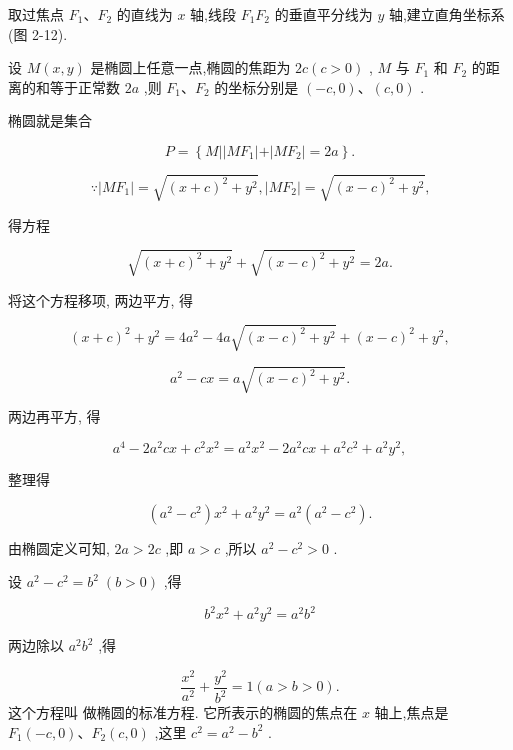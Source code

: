 \documentclass[lang=cn,newtx,10pt,scheme=chinese]{elegantbook}
\begin{document}
取过焦点 \({F}_{1}\text{、}{F}_{2}\) 的直线为 \(x\) 轴,线段 \({F}_{1}{F}_{2}\) 的垂直平分线为 \(y\) 轴,建立直角坐标系 (图 2-12).

设 \(M\left( {x,y}\right)\) 是椭圆上任意一点,椭圆的焦距为 \({2c}\left( {c > 0}\right)\) , \(M\) 与 \({F}_{1}\) 和 \({F}_{2}\) 的距离的和等于正常数 \({2a}\) ,则 \({F}_{1}\text{、}{F}_{2}\) 的坐标分别是 \(\left( {-c,0}\right) \text{、}\left( {c,0}\right)\) .

椭圆就是集合

\[
  P = \left\{ {M\left| \right| M{F}_{1}\left| +\right| M{F}_{2} \mid = {2a}}\right\} .
\]

\[
  \because \left| {M{F}_{1}}\right| = \sqrt{{\left( x + c\right) }^{2} + {y}^{2}},\left| {M{F}_{2}}\right| = \sqrt{{\left( x - c\right) }^{2} + {y}^{2}}\text{,}
\]

得方程

\[
  \sqrt{{\left( x + c\right) }^{2} + {y}^{2}} + \sqrt{{\left( x - c\right) }^{2} + {y}^{2}} = {2a}.
\]

将这个方程移项, 两边平方, 得

\[
    {\left( x + c\right) }^{2} + {y}^{2} = 4{a}^{2} - {4a}\sqrt{{\left( x - c\right) }^{2} + {y}^{2}} + {\left( x - c\right) }^{2} + {y}^{2},
\]

\[
    {a}^{2} - {cx} = a\sqrt{{\left( x - c\right) }^{2} + {y}^{2}}.
\]

两边再平方, 得

\[
    {a}^{4} - 2{a}^{2}{cx} + {c}^{2}{x}^{2} = {a}^{2}{x}^{2} - 2{a}^{2}{cx} + {a}^{2}{c}^{2} + {a}^{2}{y}^{2},
\]

整理得

\[
  \left( {{a}^{2} - {c}^{2}}\right) {x}^{2} + {a}^{2}{y}^{2} = {a}^{2}\left( {{a}^{2} - {c}^{2}}\right) .
\]

由椭圆定义可知, \({2a} > {2c}\) ,即 \(a > c\) ,所以 \({a}^{2} - {c}^{2} > 0\) .

设 \({a}^{2} - {c}^{2} = {b}^{2}\;\left( {b > 0}\right)\) ,得

\[
    {b}^{2}{x}^{2} + {a}^{2}{y}^{2} = {a}^{2}{b}^{2}
\]

两边除以 \({a}^{2}{b}^{2}\) ,得
\begin{definition}[椭圆的标准方程] 
\[
  \frac{{x}^{2}}{{a}^{2}} + \frac{{y}^{2}}{{b}^{2}} = 1\left( {a > b > 0}\right) . \tag{1}
\]
这个方程叫 做椭圆的标准方程. 它所表示的椭圆的焦点在 \(x\) 轴上,焦点是 \({F}_{1}\left( {-c,0}\right) \text{、}{F}_{2}\left( {c,0}\right)\) ,这里 \({c}^{2} = {a}^{2} - {b}^{2}\) .
\end{definition}
\end{document}
